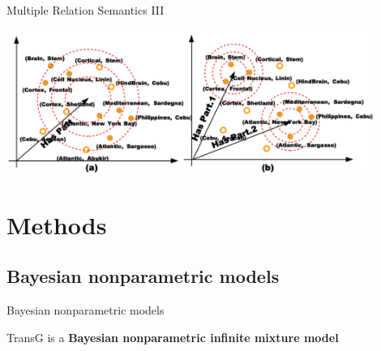 \documentclass[xcolor={x11names,svgnames,dvipsnames},trans]{beamer}
\begin{document}
\begin{frame}{Multiple Relation Semantics III}

    {\centering
    \includegraphics[width=0.90\textwidth]{images/clustering.png}\par
    }

\end{frame}

\section{Methods}
\subsection{Bayesian nonparametric models}
\begin{frame}{Bayesian nonparametric models}

    \begin{center}
        \begin{minipage}{.9\textwidth}\rmfamily
            TransG is a \textbf{Bayesian nonparametric infinite mixture model}
        \end{minipage}
    \end{center}

    \begin{figure}[H]
        \centering
        
    \end{figure}

\end{frame}
\end{document}
